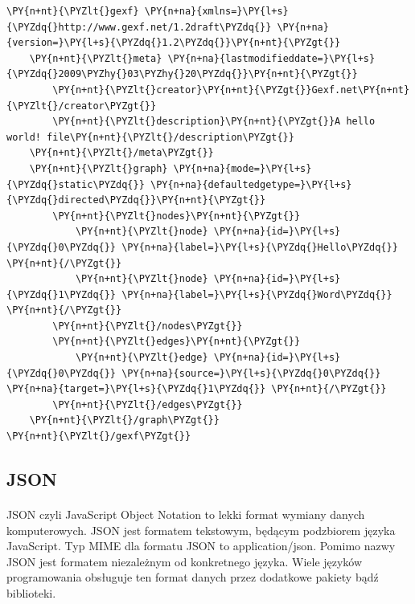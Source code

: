 \begin{program}
\begin{code}
\begin{Verbatim}[commandchars=\\\{\}]
\PY{n+nt}{\PYZlt{}gexf} \PY{n+na}{xmlns=}\PY{l+s}{\PYZdq{}http://www.gexf.net/1.2draft\PYZdq{}} \PY{n+na}{version=}\PY{l+s}{\PYZdq{}1.2\PYZdq{}}\PY{n+nt}{\PYZgt{}}
	\PY{n+nt}{\PYZlt{}meta} \PY{n+na}{lastmodifieddate=}\PY{l+s}{\PYZdq{}2009\PYZhy{}03\PYZhy{}20\PYZdq{}}\PY{n+nt}{\PYZgt{}}
		\PY{n+nt}{\PYZlt{}creator}\PY{n+nt}{\PYZgt{}}Gexf.net\PY{n+nt}{\PYZlt{}/creator\PYZgt{}}
		\PY{n+nt}{\PYZlt{}description}\PY{n+nt}{\PYZgt{}}A hello world! file\PY{n+nt}{\PYZlt{}/description\PYZgt{}}
	\PY{n+nt}{\PYZlt{}/meta\PYZgt{}}
	\PY{n+nt}{\PYZlt{}graph} \PY{n+na}{mode=}\PY{l+s}{\PYZdq{}static\PYZdq{}} \PY{n+na}{defaultedgetype=}\PY{l+s}{\PYZdq{}directed\PYZdq{}}\PY{n+nt}{\PYZgt{}}
		\PY{n+nt}{\PYZlt{}nodes}\PY{n+nt}{\PYZgt{}}
			\PY{n+nt}{\PYZlt{}node} \PY{n+na}{id=}\PY{l+s}{\PYZdq{}0\PYZdq{}} \PY{n+na}{label=}\PY{l+s}{\PYZdq{}Hello\PYZdq{}} \PY{n+nt}{/\PYZgt{}}
			\PY{n+nt}{\PYZlt{}node} \PY{n+na}{id=}\PY{l+s}{\PYZdq{}1\PYZdq{}} \PY{n+na}{label=}\PY{l+s}{\PYZdq{}Word\PYZdq{}} \PY{n+nt}{/\PYZgt{}}
		\PY{n+nt}{\PYZlt{}/nodes\PYZgt{}}
		\PY{n+nt}{\PYZlt{}edges}\PY{n+nt}{\PYZgt{}}
			\PY{n+nt}{\PYZlt{}edge} \PY{n+na}{id=}\PY{l+s}{\PYZdq{}0\PYZdq{}} \PY{n+na}{source=}\PY{l+s}{\PYZdq{}0\PYZdq{}} \PY{n+na}{target=}\PY{l+s}{\PYZdq{}1\PYZdq{}} \PY{n+nt}{/\PYZgt{}}
		\PY{n+nt}{\PYZlt{}/edges\PYZgt{}}
	\PY{n+nt}{\PYZlt{}/graph\PYZgt{}}
\PY{n+nt}{\PYZlt{}/gexf\PYZgt{}}
\end{Verbatim}
\end{code}
\end{program}

\subsection{JSON}
\paragraph{}
JSON czyli JavaScript Object Notation to lekki format wymiany danych komputerowych. 
JSON jest formatem tekstowym, będącym podzbiorem języka JavaScript. 
Typ MIME dla formatu JSON to application/json. 
Pomimo nazwy JSON jest formatem niezależnym od konkretnego języka. 
Wiele języków programowania obsługuje ten format danych przez dodatkowe pakiety bądź biblioteki.



